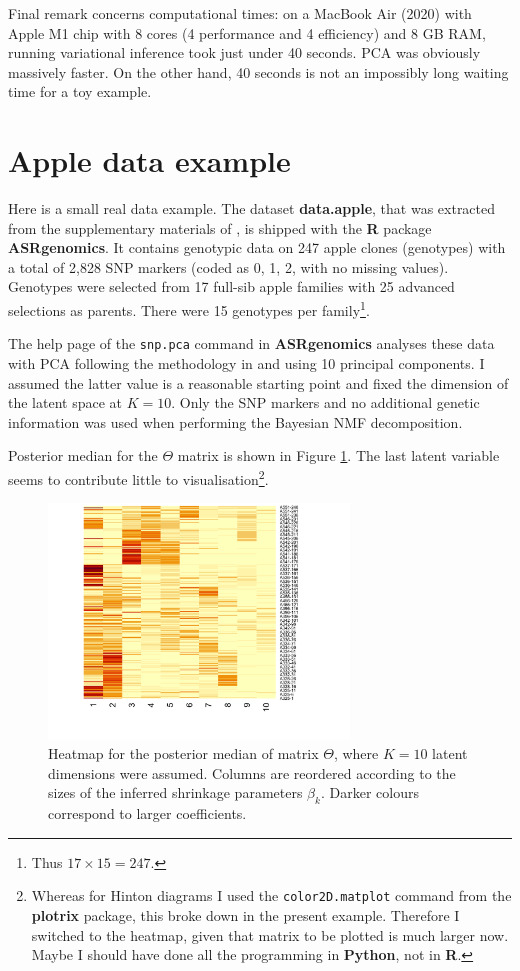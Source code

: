 \documentclass[]{article}
\begin{document}
Final remark concerns computational times: on a MacBook Air (2020) with Apple M1 chip with 8 cores (4 performance and 4 efficiency) and 8 GB RAM, running variational inference took just under 40 seconds. PCA was obviously massively faster. On the other hand, 40 seconds is not an impossibly long waiting time for a toy example.

\section{Apple data example}

Here is a small real data example. The dataset {\bf data.apple}, that was extracted from the supplementary materials of \citet{kumar2015}, is shipped with the {\bf R} package {\bf ASRgenomics}. It contains genotypic data on 247 apple clones (genotypes) with a total of 2,828 SNP markers (coded as 0, 1, 2, with no missing values). Genotypes were selected from 17 full-sib apple families with 25 advanced selections as parents. There were 15 genotypes per family\footnote{Thus $17 \times 15 = 247$.}.

The help page of the \texttt{snp.pca} command in {\bf ASRgenomics} analyses these data with PCA following the methodology in \citet{patterson2006} and using 10 principal components. I assumed the latter value is a reasonable starting point and fixed the dimension of the latent space at $K=10$. Only the SNP markers and no additional genetic information was used when performing the Bayesian NMF decomposition.

Posterior median for the $\Theta$ matrix is shown in Figure \ref{fig:theta_hat_apple}. The last latent variable seems to contribute little to visualisation\footnote{Whereas for Hinton diagrams I used the \texttt{color2D.matplot} command from the {\bf plotrix} package, this broke down in the present example. Therefore I switched to the heatmap, given that matrix to be plotted is much larger now. Maybe I should have done all the programming in {\bf Python}, not in {\bf R}.}.

\begin{figure}
	\centering
	\includegraphics[width=8cm]{theta_hat_apple.png}
	\caption{Heatmap for the posterior median of matrix $\Theta$, where $K=10$ latent dimensions were assumed. Columns are reordered according to the sizes of the inferred shrinkage parameters $\beta_k$. Darker colours correspond to larger coefficients.}
	\label{fig:theta_hat_apple}
\end{figure}
\end{document}
